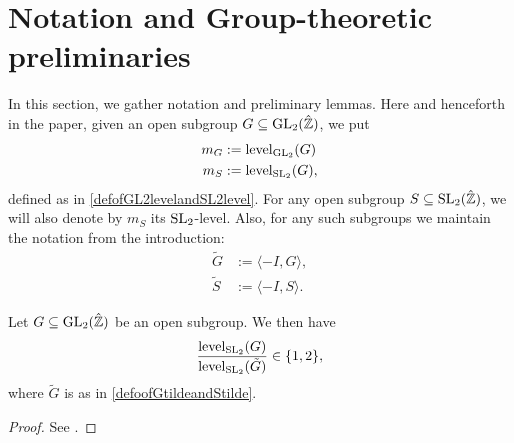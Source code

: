 \section{Notation and Group-theoretic preliminaries}

In this section, we gather notation and preliminary lemmas.  Here and henceforth in the paper, given an open subgroup $G \subseteq \operatorname{GL}_2(\hat{\mathbb{Z}})$, we put
\begin{equation*}
\begin{split}
m_G &:= \operatorname{level}_{\operatorname{GL}_2}(G) \\
m_S &:= \operatorname{level}_{\operatorname{SL}_2}(G),
\end{split}
\end{equation*}
defined as in \eqref{defofGL2levelandSL2level}.
For any open subgroup $S \subseteq \operatorname{SL}_2(\hat{\mathbb{Z}})$, we will also denote by $m_S$ its $\operatorname{SL}_2$-level.  Also, for any such subgroups we maintain the notation from the introduction:
\begin{equation} \label{defoofGtildeandStilde}
\begin{split}
\tilde{G} &:= \langle -I, G \rangle, \\
\tilde{S} &:= \langle -I, S \rangle.
\end{split}
\end{equation}
\begin{proposition} \label{levelincreaseboundprop}
Let $G \subseteq \operatorname{GL}_2(\hat{\mathbb{Z}})$ be an open subgroup.  We then have
\begin{equation} \label{Gversion}
\frac{\operatorname{level}_{\operatorname{SL}_2}(G)}{\operatorname{level}_{\operatorname{SL}_2}(\tilde{G})} \in \{ 1, 2 \},
\end{equation}
where $\tilde{G}$ is as in \eqref{defoofGtildeandStilde}.
\end{proposition}
\begin{proof}
See \cite[Lemma 3.1]{jonesmcmurdy}.
\end{proof}


